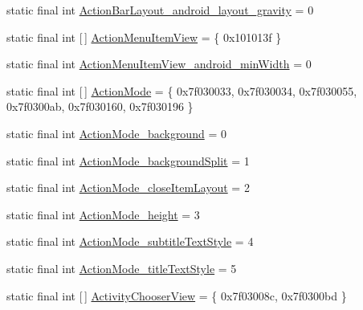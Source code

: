 \begin{DoxyCompactItemize}
\item 
static final int \mbox{\hyperlink{classandroid_1_1support_1_1v7_1_1appcompat_1_1_r_1_1styleable_a2e2986ce84f44ed522b12156ab4c80b5}{Action\+Bar\+Layout\+\_\+android\+\_\+layout\+\_\+gravity}} = 0
\item 
static final int \mbox{[}$\,$\mbox{]} \mbox{\hyperlink{classandroid_1_1support_1_1v7_1_1appcompat_1_1_r_1_1styleable_a289a3ec3805aee2d895cf1061f6f50dd}{Action\+Menu\+Item\+View}} = \{ 0x101013f \}
\item 
static final int \mbox{\hyperlink{classandroid_1_1support_1_1v7_1_1appcompat_1_1_r_1_1styleable_ab1d71534a260d9546c5e69b7d0e88dc5}{Action\+Menu\+Item\+View\+\_\+android\+\_\+min\+Width}} = 0
\item 
static final int \mbox{[}$\,$\mbox{]} \mbox{\hyperlink{classandroid_1_1support_1_1v7_1_1appcompat_1_1_r_1_1styleable_ac4197f1a9a85a8f5973cc5efa358ad9f}{Action\+Mode}} = \{ 0x7f030033, 0x7f030034, 0x7f030055, 0x7f0300ab, 0x7f030160, 0x7f030196 \}
\item 
static final int \mbox{\hyperlink{classandroid_1_1support_1_1v7_1_1appcompat_1_1_r_1_1styleable_ad7ba52748ba713c8092e94c3057ac025}{Action\+Mode\+\_\+background}} = 0
\item 
static final int \mbox{\hyperlink{classandroid_1_1support_1_1v7_1_1appcompat_1_1_r_1_1styleable_ac607392c03577a89e93114489fed7bde}{Action\+Mode\+\_\+background\+Split}} = 1
\item 
static final int \mbox{\hyperlink{classandroid_1_1support_1_1v7_1_1appcompat_1_1_r_1_1styleable_a88da42ef1d36118bca40662482cd497d}{Action\+Mode\+\_\+close\+Item\+Layout}} = 2
\item 
static final int \mbox{\hyperlink{classandroid_1_1support_1_1v7_1_1appcompat_1_1_r_1_1styleable_a2e5464164ea951a44ac4815251293494}{Action\+Mode\+\_\+height}} = 3
\item 
static final int \mbox{\hyperlink{classandroid_1_1support_1_1v7_1_1appcompat_1_1_r_1_1styleable_ac381486db10fa194bd8cbacee9e63d5d}{Action\+Mode\+\_\+subtitle\+Text\+Style}} = 4
\item 
static final int \mbox{\hyperlink{classandroid_1_1support_1_1v7_1_1appcompat_1_1_r_1_1styleable_a7035ee3ffdabf8eda2e2b3f427835911}{Action\+Mode\+\_\+title\+Text\+Style}} = 5
\item 
static final int \mbox{[}$\,$\mbox{]} \mbox{\hyperlink{classandroid_1_1support_1_1v7_1_1appcompat_1_1_r_1_1styleable_a982c115fab0715899d54b7816a21cc47}{Activity\+Chooser\+View}} = \{ 0x7f03008c, 0x7f0300bd \}
\item 

\end{DoxyCompactItemize}
